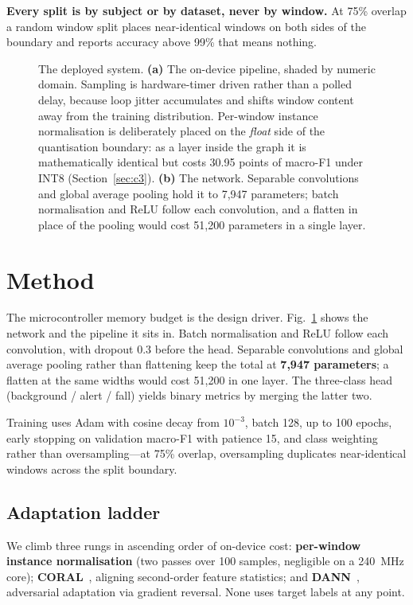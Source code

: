 \documentclass[conference]{IEEEtran}
\begin{document}
\textbf{Every split is by subject or by dataset, never by window.} At 75\% overlap a
random window split places near-identical windows on both sides of the boundary and
reports accuracy above 99\% that means nothing.

\begin{figure}[t]
\centering

\caption{The deployed system. \textbf{(a)} The on-device pipeline, shaded by numeric
domain. Sampling is hardware-timer driven rather than a polled delay, because loop
jitter accumulates and shifts window content away from the training distribution.
Per-window instance normalisation is deliberately placed on the \emph{float} side of
the quantisation boundary: as a layer inside the graph it is mathematically identical
but costs 30.95 points of macro-F1 under INT8 (Section~\ref{sec:c3}). \textbf{(b)} The
network. Separable convolutions and global average pooling hold it to 7{,}947
parameters; batch normalisation and ReLU follow each convolution, and a flatten in
place of the pooling would cost 51{,}200 parameters in a single layer.}
\label{fig:method}
\end{figure}

\section{Method}

The microcontroller memory budget is the design driver. Fig.~\ref{fig:method} shows
the network and the pipeline it sits in. Batch normalisation and ReLU follow each
convolution, with dropout $0.3$ before the head. Separable convolutions and global
average pooling rather than flattening keep the total at \textbf{7{,}947 parameters};
a flatten at the same widths would cost 51{,}200 in one layer. The three-class head
(background / alert / fall) yields binary metrics by merging the latter two.

Training uses Adam with cosine decay from $10^{-3}$, batch 128, up to 100 epochs,
early stopping on validation macro-F1 with patience 15, and class weighting rather
than oversampling---at 75\% overlap, oversampling duplicates near-identical windows
across the split boundary.

\subsection{Adaptation ladder}

We climb three rungs in ascending order of on-device cost: \textbf{per-window instance
normalisation} (two passes over 100 samples, negligible on a 240~MHz core);
\textbf{CORAL}~\cite{sun2016coral}, aligning second-order feature statistics; and
\textbf{DANN}~\cite{ganin2016dann}, adversarial adaptation via gradient reversal. None
uses target labels at any point.
\end{document}
